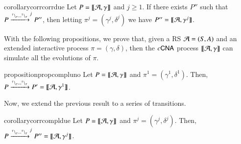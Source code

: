  \begin{restatable}[Correctness 2]{corollary}{corrcorrdue} 
 \label{corr:corr2}
  Let $P = \llbracket{\cal A},\gamma\rrbracket$ and $j\geq 1$.
If there exists  $P''$ such that $P \xrightarrow{{}^{\tau} \backslash_{\tau}\dots {}^{\tau} \backslash_{\tau}}^{j}P''$, then letting  $\pi^j=(\gamma^j,\delta^j)$ we have
$P'' =\llbracket{\cal A},\gamma^j\rrbracket$.
 \end{restatable}

\noindent
With the following propositions, we prove that, given a RS ${\cal A} = (S, A)$ and an extended  interactive process $\pi=(\gamma,\delta)$, then the $c\textsf{CNA}$ process $\llbracket{\cal A},\gamma\rrbracket$ can simulate all the evolutions  of $\pi$. 

 \begin{restatable}[Completeness 1]{proposition}{propcompluno} 
 \label{prop:compl1}
Let   $P=\llbracket{\cal A},\gamma\rrbracket$ and $\pi^1 = (\gamma^1,\delta^1)$.
Then, 
  $P \xrightarrow{{}^{\tau} \backslash_{\tau}\dots {}^{\tau} \backslash_{\tau}} P'=\llbracket{\cal A},\gamma^1\rrbracket$.
\end{restatable}

\noindent
Now, we extend the previous result to a series of transitions.
 
\begin{restatable}[Completeness 2]{corollary}{corrcompldue} 
 \label{corr:compl2}
Let $P=\llbracket{\cal A},\gamma\rrbracket$ and  $\pi^j= (\gamma^j,\delta^j)$.  
Then, $P \xrightarrow{{}^{\tau} \backslash_{\tau}\dots{}^{\tau} \backslash_{\tau}}^j P''=\llbracket{\cal A},\gamma^j\rrbracket$.  
 \end{restatable}

